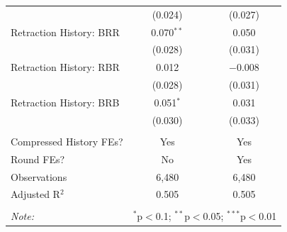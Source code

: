 \begin{table}[!htbp]
\begin{tabular}{@{\extracolsep{5pt}}lcc}
  & (0.024) & (0.027) \\ 
  Retraction History: BRR & 0.070$^{**}$ & 0.050 \\ 
  & (0.028) & (0.031) \\ 
  Retraction History: RBR & 0.012 & $-$0.008 \\ 
  & (0.028) & (0.031) \\ 
  Retraction History: BRB & 0.051$^{*}$ & 0.031 \\ 
  & (0.030) & (0.033) \\ 
 \hline \\[-1.8ex] 
Compressed History FEs? & Yes & Yes \\ 
Round FEs? & No & Yes \\ 
Observations & 6,480 & 6,480 \\ 
Adjusted R$^{2}$ & 0.505 & 0.505 \\ 
\hline 
\hline \\[-1.8ex] 
\textit{Note:}  & \multicolumn{2}{r}{$^{*}$p$<$0.1; $^{**}$p$<$0.05; $^{***}$p$<$0.01} \\ 
\end{tabular} 
\end{table} 
